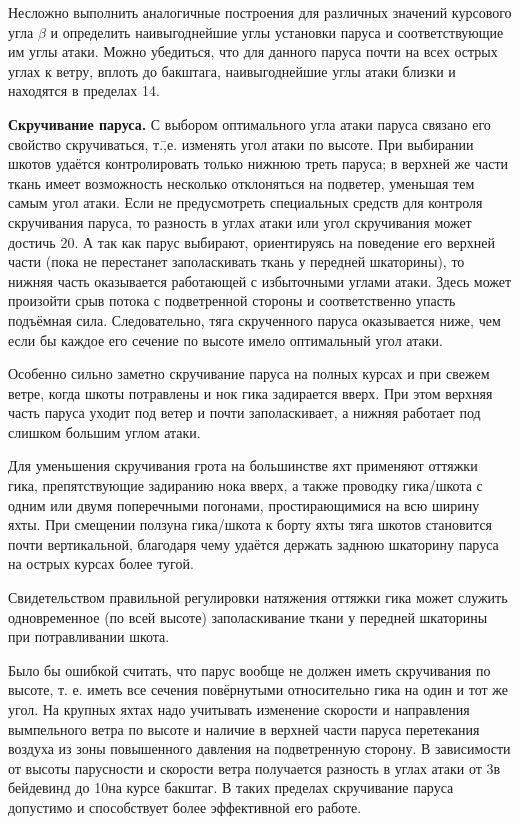 Несложно выполнить аналогичные построения для различных значений
курсового угла $\beta$ и определить наивыгоднейшие углы установки
паруса и соответствующие им углы атаки. Можно убедиться, что для
данного паруса почти на всех острых углах к ветру, вплоть до бакштага,
наивыгоднейшие углы атаки близки и находятся в пределах 14\gr.

\textbf{Скручивание паруса.}
 С выбором оптимального
угла атаки паруса связано его свойство скручиваться, т.\=,е. изменять
угол атаки по высоте. При выбирании шкотов удаётся контролировать
только нижнюю треть паруса; в верхней же части ткань имеет возможность
несколько отклоняться на подветер, уменьшая тем самым угол атаки. Если
не предусмотреть специальных средств для контроля скручивания паруса,
то разность в углах атаки или угол скручивания может достичь 20\gr. А
так как парус выбирают, ориентируясь на поведение его верхней части
(пока не перестанет заполаскивать ткань у передней шкаторины), то
нижняя часть оказывается работающей с избыточными углами атаки. Здесь
может произойти срыв потока с подветренной стороны и соответственно
упасть подъёмная сила. Следовательно, тяга скрученного паруса
оказывается ниже, чем если бы каждое его сечение по высоте имело
оптимальный угол атаки.

Особенно сильно заметно скручивание паруса на полных курсах и при
свежем ветре, когда шкоты потравлены и нок гика задирается вверх. При
этом верхняя часть паруса уходит под ветер и почти заполаскивает, а
нижняя работает под слишком большим углом атаки.

Для уменьшения скручивания грота на большинстве яхт применяют оттяжки
гика, препятствующие задиранию нока вверх, а также проводку
гика\-/шкота с одним или двумя поперечными погонами, простирающимися
на всю ширину яхты. При смещении ползуна гика\-/шкота к борту яхты
тяга шкотов становится почти вертикальной, благодаря чему удаётся
держать заднюю шкаторину паруса на острых курсах более тугой.

Свидетельством правильной регулировки натяжения оттяжки гика может
служить одновременное (по всей высоте) заполаскивание ткани у передней
шкаторины при потравливании шкота.

Было бы ошибкой считать, что парус вообще не должен иметь скручивания
по высоте, т. е. иметь все сечения повёрнутыми относительно гика на
один и тот же угол. На крупных яхтах надо учитывать изменение скорости
и направления вымпельного ветра по высоте и наличие в верхней части
паруса перетекания воздуха из зоны повышенного давления на
подветренную сторону. В зависимости от высоты парусности и скорости
ветра получается разность в углах атаки от 3\gr в бейдевинд до
10\gr на курсе бакштаг. В таких пределах скручивание паруса
допустимо и способствует более эффективной его работе.

